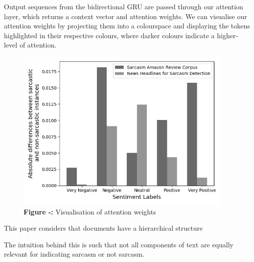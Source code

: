 \documentclass[12pt,a4paper]{article}
\begin{document}
\hspace{-17pt}\begin{minipage}{0.6\textwidth}
	 Output sequences from the bidirectional GRU are passed through our attention layer, which returns a context vector and attention weights. We can visualise our attention weights by projecting them into a colourspace and displaying the tokens highlighted in their respective colours, where darker colours indicate a higher-level of attention.\\
\end{minipage}
\hspace{0pt}
\begin{minipage}{0.4\textwidth}
\begin{figure}[H]
	\begin{center}
		\includegraphics[width=0.95\textwidth]{Images/absolute_differences.png}
		\textbf{Figure -:} Visualisation of attention weights\\
	\end{center}
\end{figure}
\end{minipage}











This paper considers that documents have a hierarchical structure


The intuition behind this is such that not all components of text are equally relevant for indicating sarcasm or not sarcasm. 
\end{document}
